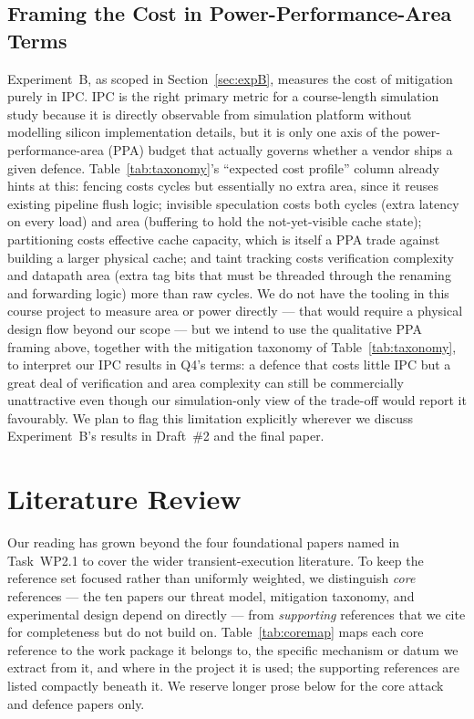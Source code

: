 \documentclass[11pt,a4paper]{article}
\begin{document}
\subsection{Framing the Cost in Power-Performance-Area Terms}
\label{sec:ppa}

Experiment~B, as scoped in Section~\ref{sec:expB}, measures the cost of
mitigation purely in IPC. IPC is the right primary metric for a course-length
simulation study because it is directly observable from simulation platform without
modelling silicon implementation details, but it is only one axis of the
power-performance-area (PPA) budget that actually governs whether a vendor
ships a given defence. Table~\ref{tab:taxonomy}'s ``expected cost profile''
column already hints at this: fencing costs cycles but essentially no extra
area, since it reuses existing pipeline flush logic; invisible speculation
costs both cycles (extra latency on every load) and area (buffering to hold
the not-yet-visible cache state); partitioning costs effective cache
capacity, which is itself a PPA trade against building a larger physical
cache; and taint tracking costs verification complexity and datapath area
(extra tag bits that must be threaded through the renaming and forwarding
logic) more than raw cycles. We do not have the tooling in this course
project to measure area or power directly --- that would require a physical
design flow beyond our scope --- but we intend to use the qualitative PPA
framing above, together with the mitigation taxonomy of
Table~\ref{tab:taxonomy}, to interpret our IPC results in Q4's terms: a
defence that costs little IPC but a great deal of verification and area
complexity can still be commercially unattractive even though our
simulation-only view of the trade-off would report it favourably. We plan to
flag this limitation explicitly wherever we discuss Experiment~B's results in
Draft~\#2 and the final paper.

\clearpage

\section{Literature Review}
\label{sec:litreview}

Our reading has grown beyond the four foundational papers named in Task~WP2.1
to cover the wider transient-execution literature. To keep the reference set
focused rather than uniformly weighted, we distinguish \emph{core} references
--- the ten papers our threat model, mitigation taxonomy, and experimental
design depend on directly --- from \emph{supporting} references that we cite for
completeness but do not build on. Table~\ref{tab:coremap} maps each core
reference to the work package it belongs to, the specific mechanism or datum we
extract from it, and where in the project it is used; the supporting references
are listed compactly beneath it. We reserve longer prose below for the core
attack and defence papers only.
\end{document}
